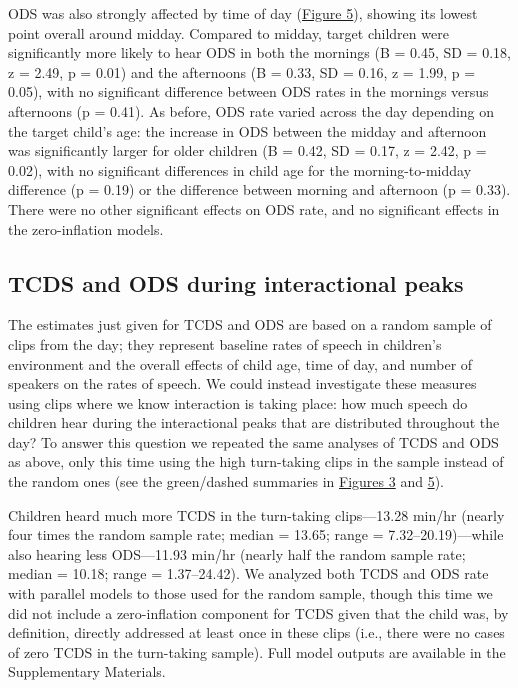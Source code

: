 \documentclass[,man,floatsintext]{apa6}
\begin{document}
ODS was also strongly affected by time of day
(\protect\hyperlink{fig5}{Figure 5}), showing its lowest point overall
around midday. Compared to midday, target children were significantly
more likely to hear ODS in both the mornings (B = 0.45, SD = 0.18, z =
2.49, p = 0.01) and the afternoons (B = 0.33, SD = 0.16, z = 1.99, p =
0.05), with no significant difference between ODS rates in the mornings
versus afternoons (p = 0.41). As before, ODS rate varied across the day
depending on the target child's age: the increase in ODS between the
midday and afternoon was significantly larger for older children (B =
0.42, SD = 0.17, z = 2.42, p = 0.02), with no significant differences in
child age for the morning-to-midday difference (p = 0.19) or the
difference between morning and afternoon (p = 0.33). There were no other
significant effects on ODS rate, and no significant effects in the
zero-inflation models.

\subsection{TCDS and ODS during interactional
peaks}\label{tcds-and-ods-during-interactional-peaks}

The estimates just given for TCDS and ODS are based on a random sample
of clips from the day; they represent baseline rates of speech in
children's environment and the overall effects of child age, time of
day, and number of speakers on the rates of speech. We could instead
investigate these measures using clips where we know interaction is
taking place: how much speech do children hear during the interactional
peaks that are distributed throughout the day? To answer this question
we repeated the same analyses of TCDS and ODS as above, only this time
using the high turn-taking clips in the sample instead of the random
ones (see the green/dashed summaries in \protect\hyperlink{fig3}{Figures
3} and \protect\hyperlink{fig5}{5}).

Children heard much more TCDS in the turn-taking clips---13.28 min/hr
(nearly four times the random sample rate; median = 13.65; range =
7.32--20.19)---while also hearing less ODS---11.93 min/hr (nearly half
the random sample rate; median = 10.18; range = 1.37--24.42). We
analyzed both TCDS and ODS rate with parallel models to those used for
the random sample, though this time we did not include a zero-inflation
component for TCDS given that the child was, by definition, directly
addressed at least once in these clips (i.e., there were no cases of
zero TCDS in the turn-taking sample). Full model outputs are available
in the Supplementary Materials.
\end{document}
